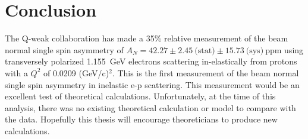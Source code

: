 \section{Conclusion}
\label{Conclusion}

The Q-weak collaboration has made a 35\% relative measurement of the beam normal single spin asymmetry of $A_{N} = 42.27\pm2.45~\text{(stat)}\pm15.73~\text{(sys)}~\text{ppm}$ using transversely polarized 1.155~GeV electrons scattering in-elastically from protons with a $Q^{2}$ of 0.0209 (GeV/c)$^{2}$. This is the first measurement of the beam normal single spin asymmetry in inelastic e-p scattering. This measurement would be an excellent test of theoretical calculations. Unfortunately, at the time of this analysis, there was no existing theoretical calculation or model to compare with the data. Hopefully this thesis will encourage theoreticians to produce new calculations. 



